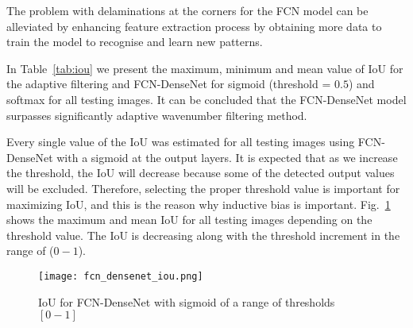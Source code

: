 The problem with delaminations at the corners for the FCN model can be alleviated by enhancing feature extraction process by obtaining more data to train the model to recognise and learn new patterns.

In Table~\ref{tab:iou} we present the maximum, minimum and mean value of IoU for the adaptive filtering and FCN-DenseNet for sigmoid (threshold = \(0.5\)) and softmax for all testing images.
It can be concluded that the FCN-DenseNet model surpasses significantly adaptive wavenumber filtering method. 
	\begin{table}
	 \renewcommand{\arraystretch}{1.3}
		\centering
		\caption{IoU for all models}
		\label{tab:iou}
	\end{table}
	
Every single value of the IoU was estimated for all testing images using FCN-DenseNet with a sigmoid at the output layers.
It is expected that as we increase the threshold, the IoU will decrease because some of the detected output values will be excluded.
Therefore, selecting the proper threshold value is important for maximizing IoU, and this is the reason why inductive bias is important. 
Fig.~\ref{fig:iou_fcn} shows the maximum and mean IoU for all testing images depending on the threshold value. 
The IoU is decreasing along with the threshold increment in the range of (\(0-1\)).
	\begin{figure}[!h] 
		\centering
		\texttt{[image: fcn\_densenet\_iou.png]}
		\centering
		\caption{IoU for FCN-DenseNet with sigmoid of a range of thresholds \([0-1]\)} 
		\label{fig:iou_fcn}
	\end{figure}
	
